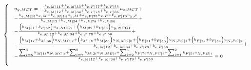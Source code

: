 \documentclass[a4paper]{jpconf}
\begin{document}
\begin{equation}
\scriptsize
\begin{cases}
&u_{y,MCT}=-\frac{k_{e,M|11}+k_{e,M|33}+k_{e,F|77}+k_{e,F|55}}{k_{e,M|12}+k_{e,M|34}+k_{e,F|78}+k_{e,F|56}}u_{x,MCT}+\\
&-\frac{k_{e,M|13}u_{x,M}+k_{e,M|14}u_{y,M}+k_{e,F|75}u_{x,F}+k_{e,F|76}u_{y,F}}{k_{e,M|12}+k_{e,M|34}+k_{e,F|78}+k_{e,F|56}}+\\
&-\frac{\left(k_{M|31}+k_{F|57}\right)u_{x,NCOI}+\left(k_{M|32}+k_{F|58}\right)u_{y,NCOI}}{k_{e,M|12}+k_{e,M|34}+k_{e,F|78}+k_{e,F|56}}+\\
&-\frac{\left(k_{M|17}+k_{M|35}\right)u_{N,MC|7}+\left(k_{M|18}+k_{M|36}\right)u_{N,MC|8}+\left(k_{F|71}+k_{F|53}\right)u_{N,FC|1}+\left(k_{F|72}+k_{F|54}\right)u_{N,FC|2}}{k_{e,M|12}+k_{e,M|34}+k_{e,F|78}+k_{e,F|56}}+\\&-\frac{\sum_{i=5}^{6}k_{M|1i}u_{N,MC|i}+\sum_{i=7}^{8}k_{M|3i}u_{N,MB|i}+\sum_{i=2}^{3}k_{F|7i}u_{N,FC|i}+\sum_{i=1}^{2}k_{F|5i}u_{N,FB|i}}{k_{e,M|12}+k_{e,M|34}+k_{e,F|78}+k_{e,F|56}}=0\\[10pt]


\end{cases}
\end{equation}
\end{document}
